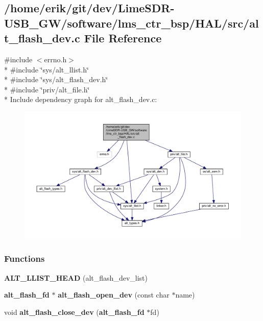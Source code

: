 \subsection{/home/erik/git/dev/\+Lime\+S\+D\+R-\/\+U\+S\+B\+\_\+\+G\+W/software/lms\+\_\+ctr\+\_\+bsp/\+H\+A\+L/src/alt\+\_\+flash\+\_\+dev.c File Reference}
\label{alt__flash__dev_8c}
{\ttfamily \#include $<$errno.\+h$>$}\\*
{\ttfamily \#include \char`\"{}sys/alt\+\_\+llist.\+h\char`\"{}}\\*
{\ttfamily \#include \char`\"{}sys/alt\+\_\+flash\+\_\+dev.\+h\char`\"{}}\\*
{\ttfamily \#include \char`\"{}priv/alt\+\_\+file.\+h\char`\"{}}\\*
Include dependency graph for alt\+\_\+flash\+\_\+dev.\+c\+:
\nopagebreak
\begin{figure}[H]
\begin{center}
\leavevmode
\includegraphics[width=350pt]{d7/df7/alt__flash__dev_8c__incl}
\end{center}
\end{figure}
\subsubsection*{Functions}
\begin{DoxyCompactItemize}
\item 
{\bf A\+L\+T\+\_\+\+L\+L\+I\+S\+T\+\_\+\+H\+E\+AD} (alt\+\_\+flash\+\_\+dev\+\_\+list)
\item 
{\bf alt\+\_\+flash\+\_\+fd} $\ast$ {\bf alt\+\_\+flash\+\_\+open\+\_\+dev} (const char $\ast$name)
\item 
void {\bf alt\+\_\+flash\+\_\+close\+\_\+dev} ({\bf alt\+\_\+flash\+\_\+fd} $\ast$fd)
\end{DoxyCompactItemize}


